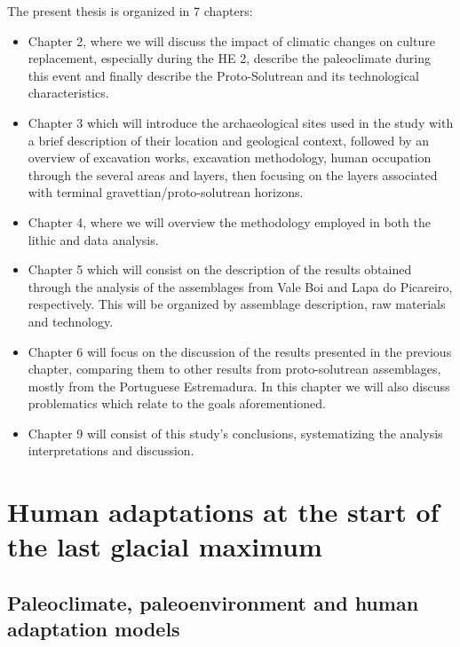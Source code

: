 \documentclass[12pt,twoside]{reedthesis}
\begin{document}
The present thesis is organized in 7 chapters:
\begin{itemize}
\item
  Chapter 2, where we will discuss the impact of climatic changes on culture replacement, especially during the HE 2, describe the paleoclimate during this event and finally describe the Proto-Solutrean and its technological characteristics.
\item
  Chapter 3 which will introduce the archaeological sites used in the study with a brief description of their location and geological context, followed by an overview of excavation works, excavation methodology, human occupation through the several areas and layers, then focusing on the layers associated with terminal gravettian/proto-solutrean horizons.
\item
  Chapter 4, where we will overview the methodology employed in both the lithic and data analysis.
\item
  Chapter 5 which will consist on the description of the results obtained through the analysis of the assemblages from Vale Boi and Lapa do Picareiro, respectively. This will be organized by assemblage description, raw materials and technology.
\item
  Chapter 6 will focus on the discussion of the results presented in the previous chapter, comparing them to other results from proto-solutrean assemblages, mostly from the Portuguese Estremadura. In this chapter we will also discuss problematics which relate to the goals aforementioned.
\item
  Chapter 9 will consist of this study's conclusions, systematizing the analysis interpretations and discussion.
\end{itemize}
\hypertarget{human-adaptations-at-the-start-of-the-last-glacial-maximum}{%
\chapter{Human adaptations at the start of the last glacial maximum}\label{human-adaptations-at-the-start-of-the-last-glacial-maximum}}

\hypertarget{paleoclimate-paleoenvironment-and-human-adaptation-models}{%
\section{Paleoclimate, paleoenvironment and human adaptation models}\label{paleoclimate-paleoenvironment-and-human-adaptation-models}}
\end{document}
